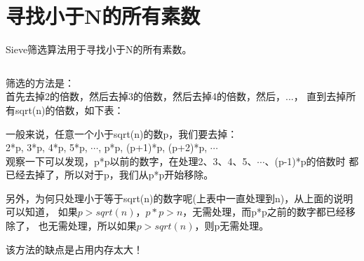 ﻿
\section[寻找小于N的所有素数]{寻找小于N的所有素数}
Sieve筛选算法用于寻找小于N的所有素数。\par
\inputminted[linenos,tabsize=4,bgcolor=srcbg]{cpp}{srcdir/Sieve.c}

筛选的方法是：\\
首先去掉2的倍数，然后去掉3的倍数，然后去掉4的倍数，然后，...，
直到去掉所有sqrt(n)的倍数，如下表：\par
{}

一般来说，任意一个小于sqrt(n)的数p，我们要去掉：\\
2*p, 3*p, 4*p, 5*p, $\cdots$, p*p, (p+1)*p, (p+2)*p, $\cdots$\\
观察一下可以发现，p*p以前的数字，在处理2、3、4、5、$\cdots$、(p-1)*p的倍数时
都已经去掉了，所以对于p，我们从p*p开始移除。

另外，为何只处理小于等于sqrt(n)的数字呢(上表中一直处理到n)，从上面的说明可以知道，
如果$p>sqrt(n)$，$p*p>n$，无需处理，而p*p之前的数字都已经移除了，
也无需处理，所以如果$p>sqrt(n)$，则p无需处理。

该方法的缺点是占用内存太大！